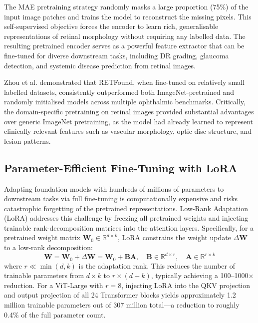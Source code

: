 The MAE pretraining strategy randomly masks a large proportion (75\%) of the input image patches and trains the model to reconstruct the missing pixels. This self-supervised objective forces the encoder to learn rich, generalisable representations of retinal morphology without requiring any labelled data. The resulting pretrained encoder serves as a powerful feature extractor that can be fine-tuned for diverse downstream tasks, including DR grading, glaucoma detection, and systemic disease prediction from retinal images.

Zhou et al. demonstrated that RETFound, when fine-tuned on relatively small labelled datasets, consistently outperformed both ImageNet-pretrained and randomly initialised models across multiple ophthalmic benchmarks. Critically, the domain-specific pretraining on retinal images provided substantial advantages over generic ImageNet pretraining, as the model had already learned to represent clinically relevant features such as vascular morphology, optic disc structure, and lesion patterns.

\subsection{Parameter-Efficient Fine-Tuning with LoRA}

Adapting foundation models with hundreds of millions of parameters to downstream tasks via full fine-tuning is computationally expensive and risks catastrophic forgetting of the pretrained representations. Low-Rank Adaptation (LoRA) \cite{hu2022lora} addresses this challenge by freezing all pretrained weights and injecting trainable rank-decomposition matrices into the attention layers. Specifically, for a pretrained weight matrix $\mathbf{W}_0 \in \mathbb{R}^{d \times k}$, LoRA constrains the weight update $\Delta\mathbf{W}$ to a low-rank decomposition:
\begin{equation}
    \mathbf{W} = \mathbf{W}_0 + \Delta\mathbf{W} = \mathbf{W}_0 + \mathbf{B}\mathbf{A}, \quad \mathbf{B} \in \mathbb{R}^{d \times r}, \quad \mathbf{A} \in \mathbb{R}^{r \times k}
\end{equation}
where $r \ll \min(d, k)$ is the adaptation rank. This reduces the number of trainable parameters from $d \times k$ to $r \times (d + k)$, typically achieving a 100--1000$\times$ reduction. For a ViT-Large with $r = 8$, injecting LoRA into the QKV projection and output projection of all 24 Transformer blocks yields approximately 1.2 million trainable parameters out of 307 million total---a reduction to roughly 0.4\% of the full parameter count.

